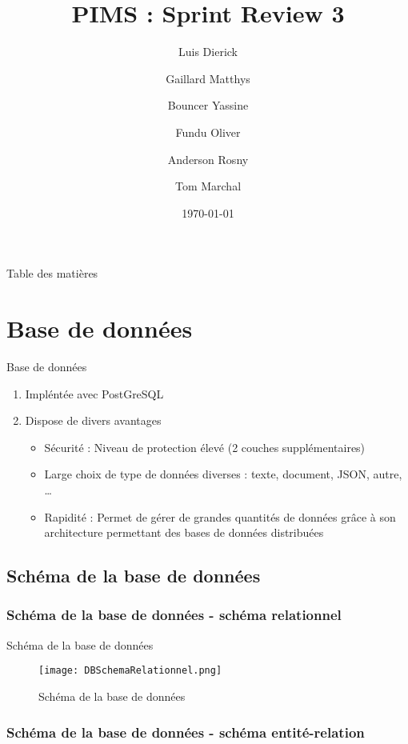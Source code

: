 \documentclass[numbering=fraction]{beamer}
\title{PIMS : Sprint Review 3}
\author[PIMS]{Luis Dierick \and Gaillard Matthys \and Bouncer Yassine \and Fundu Oliver \and Anderson Rosny \and Tom Marchal }
\institute{Université de Namur}
\date{\today}
\begin{document}
\begin{frame}[plain]{}
    \maketitle
\end{frame}

\begin{frame}{Table des matières}
    \tableofcontents
\end{frame}
\section{Base de données}
\begin{frame}{Base de données}
    \begin{enumerate}
        \item Impléntée avec PostGreSQL
        \item Dispose de divers avantages
        \begin{itemize}
            \item Sécurité : Niveau de protection élevé (2 couches supplémentaires)
            \item Large choix de type de données diverses : texte, document, JSON, autre, \dots
            \item Rapidité : Permet de gérer de grandes quantités de données grâce à son architecture permettant des bases de données distribuées
        \end{itemize}
    \end{enumerate}
\end{frame}
\subsection{Schéma de la base de données}
\subsubsection{Schéma de la base de données - schéma relationnel}
\begin{frame}{Schéma de la base de données}
    \begin{figure}
        \centering
        \texttt{[image: DBSchemaRelationnel.png]}
        \caption{Schéma de la base de données}
    \end{figure}
\end{frame}
\subsubsection{Schéma de la base de données - schéma entité-relation}
\end{document}
